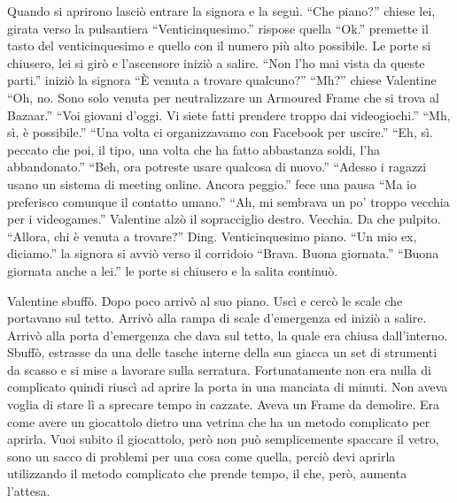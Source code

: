     Quando si aprirono lasciò entrare la signora e la seguì. ``Che piano?'' chiese lei, girata verso la pulsantiera
    ``Venticinquesimo.'' rispose quella ``Ok.'' premette il tasto del venticinquesimo e quello con il numero più alto
    possibile. Le porte si chiusero, lei si girò e l'ascensore iniziò a salire. ``Non l'ho mai vista da queste parti.''
    iniziò la signora ``È venuta a trovare qualcuno?'' ``Mh?'' chiese Valentine ``Oh, no. Sono solo venuta per
    neutralizzare un Armoured Frame che si trova al Bazaar.'' ``Voi giovani d'oggi. Vi siete fatti prendere troppo dai
    videogiochi.'' ``Mh, sì, è possibile.'' ``Una volta ci organizzavamo con Facebook per uscire.'' ``Eh, sì. peccato
    che poi, il tipo, una volta che ha fatto abbastanza soldi, l'ha abbandonato.'' ``Beh, ora potreste usare qualcosa di
    nuovo.'' ``Adesso i ragazzi usano un sistema di meeting online. Ancora peggio.'' fece una pausa ``Ma io preferisco
    comunque il contatto umano.'' ``Ah, mi sembrava un po' troppo vecchia per i videogames.'' Valentine alzò il
    sopracciglio destro. Vecchia. Da che pulpito. ``Allora, chi è venuta a trovare?'' Ding. Venticinquesimo piano. ``Un
    mio ex, diciamo.'' la signora si avviò verso il corridoio ``Brava. Buona giornata.'' ``Buona giornata anche a lei.''
    le porte si chiusero e la salita continuò.

    Valentine sbuffò. Dopo poco arrivò al suo piano. Uscì e cercò le scale che portavano sul tetto. Arrivò alla rampa di
    scale d'emergenza ed iniziò a salire. Arrivò alla porta d'emergenza che dava sul tetto, la quale era chiusa
    dall'interno. Sbuffò, estrasse da una delle tasche interne della sua giacca un set di strumenti da scasso e si mise
    a lavorare sulla serratura. Fortunatamente non era nulla di complicato quindi riuscì ad aprire la porta in una
    manciata di minuti. Non aveva voglia di stare lì a sprecare tempo in cazzate. Aveva un Frame da demolire. Era come
    avere un giocattolo dietro una vetrina che ha un metodo complicato per aprirla. Vuoi subito il giocattolo, però non
    può semplicemente spaccare il vetro, sono un sacco di problemi per una cosa come quella, perciò devi aprirla
    utilizzando il metodo complicato che prende tempo, il che, però, aumenta l'attesa.

